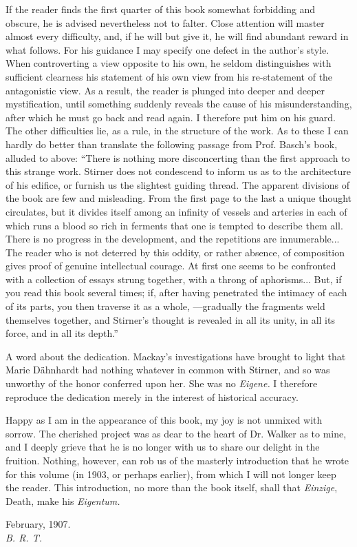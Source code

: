 If the reader finds the first quarter of this book somewhat forbidding and 
obscure, he is advised nevertheless not to falter. Close attention will master 
almost every difficulty, and, if he will but give it, he will find abundant 
reward in what follows. For his guidance I may specify one defect in the 
author's style. When controverting a view opposite to his own, he seldom 
distinguishes with sufficient clearness his statement of his own view from his 
re-statement of the antagonistic view. As a result, the reader is plunged into 
deeper and deeper mystification, until something suddenly reveals the cause of 
his misunderstanding, after which he must go back and read again. I therefore 
put him on his guard. The other difficulties lie, as a rule, in the structure 
of the work. As to these I can hardly do better than translate the following 
passage from Prof. Basch's book, alluded to above: ``There is nothing more 
disconcerting than the first approach to this strange work. Stirner does not 
condescend to inform us as to the architecture of his edifice, or furnish us 
the slightest guiding thread. The apparent divisions of the book are few and 
misleading. From the first page to the last a unique thought circulates, but 
it divides itself among an infinity of vessels and arteries in each of which 
runs a blood so rich in ferments that one is tempted to describe them all. 
There is no progress in the development, and the repetitions are 
innumerable... The reader who is not deterred by this oddity, or rather 
absence, of composition gives proof of genuine intellectual courage. At first 
one seems to be confronted with a collection of essays strung together, with a 
throng of aphorisms... But, if you read this book several times; if, after 
having penetrated the intimacy of each of its parts, you then traverse it as a 
whole, ---gradually the fragments weld themselves together, and Stirner's 
thought is revealed in all its unity, in all its force, and in all its 
depth.''

A word about the dedication. Mackay's investigations have brought to light 
that Marie D\"ahnhardt had nothing whatever in common with Stirner, and so was 
unworthy of the honor conferred upon her. She was no \textit{Eigene.} I 
therefore reproduce the dedication merely in the interest of historical 
accuracy.

Happy as I am in the appearance of this book, my joy is not unmixed with 
sorrow. The cherished project was as dear to the heart of Dr. Walker as to 
mine, and I deeply grieve that he is no longer with us to share our delight in 
the fruition. Nothing, however, can rob us of the masterly introduction that 
he wrote for this volume (in 1903, or perhaps earlier), from which I will not 
longer keep the reader. This introduction, no more than the book itself, shall 
that \textit{Einzige}, Death, make his \textit{Eigentum.}

\begin{flushright}
February, 1907.\\
 \textit{B. R. T.}\end{flushright}
